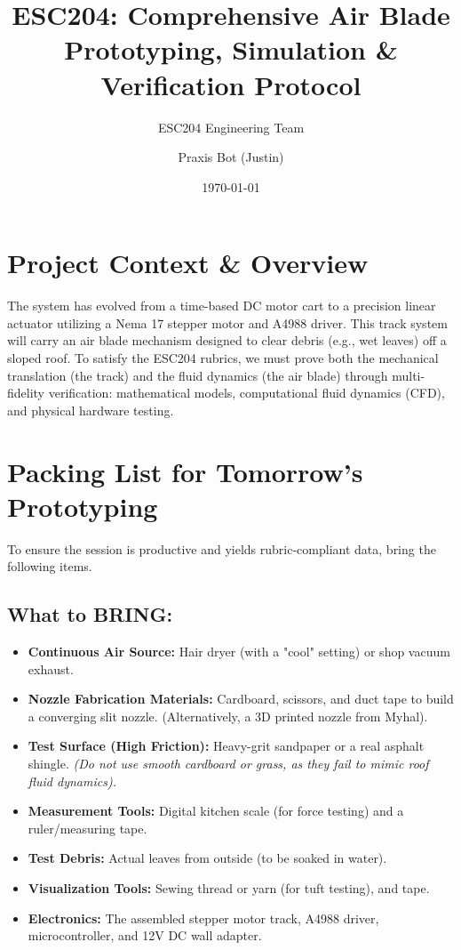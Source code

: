 \documentclass{article}
\title{ESC204: Comprehensive Air Blade Prototyping, Simulation \& Verification Protocol}
\author{ESC204 Engineering Team \and Praxis Bot (Justin)}
\date{\today}
\begin{document}
\maketitle

\section{Project Context \& Overview}
The system has evolved from a time-based DC motor cart to a precision linear actuator utilizing a Nema 17 stepper motor and A4988 driver. This track system will carry an air blade mechanism designed to clear debris (e.g., wet leaves) off a sloped roof. To satisfy the ESC204 rubrics, we must prove both the mechanical translation (the track) and the fluid dynamics (the air blade) through multi-fidelity verification: mathematical models, computational fluid dynamics (CFD), and physical hardware testing.

\section{Packing List for Tomorrow's Prototyping}
To ensure the session is productive and yields rubric-compliant data, bring the following items. 

\subsection{What to BRING:}
\begin{itemize}
    \item \textbf{Continuous Air Source:} Hair dryer (with a "cool" setting) or shop vacuum exhaust.
    \item \textbf{Nozzle Fabrication Materials:} Cardboard, scissors, and duct tape to build a converging slit nozzle. (Alternatively, a 3D printed nozzle from Myhal).
    \item \textbf{Test Surface (High Friction):} Heavy-grit sandpaper or a real asphalt shingle. \textit{(Do not use smooth cardboard or grass, as they fail to mimic roof fluid dynamics).}
    \item \textbf{Measurement Tools:} Digital kitchen scale (for force testing) and a ruler/measuring tape.
    \item \textbf{Test Debris:} Actual leaves from outside (to be soaked in water).
    \item \textbf{Visualization Tools:} Sewing thread or yarn (for tuft testing), and tape.
    \item \textbf{Electronics:} The assembled stepper motor track, A4988 driver, microcontroller, and 12V DC wall adapter.
\end{itemize}
\end{document}
